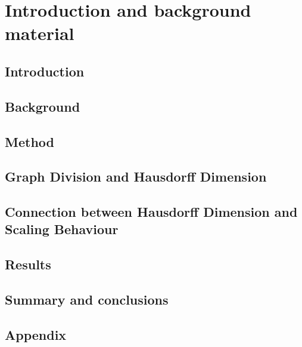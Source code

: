 \documentclass[nocoverpage,swedish,g5paper]{thesis}
\begin{document}
\begin{preface}

\end{preface}

\tableofcontents

\mainmatter

\part{Introduction and background material}

\chapter{Introduction}


\chapter{Background}\label{ch:Background}


\chapter{Method}\label{ch:Method}


\chapter{Graph Division and Hausdorff Dimension}\label{ch:GraphDivisionandHausdorffDim}


\chapter{Connection between Hausdorff Dimension and Scaling Behaviour}\label{ch:HausdorffScaling}


\chapter{Results}\label{ch:Results}


\chapter{Summary and conclusions}\label{ch:Summary}


\chapter{Appendix}\label{ch:appendix}



%

\nocite{*}


\end{document}
